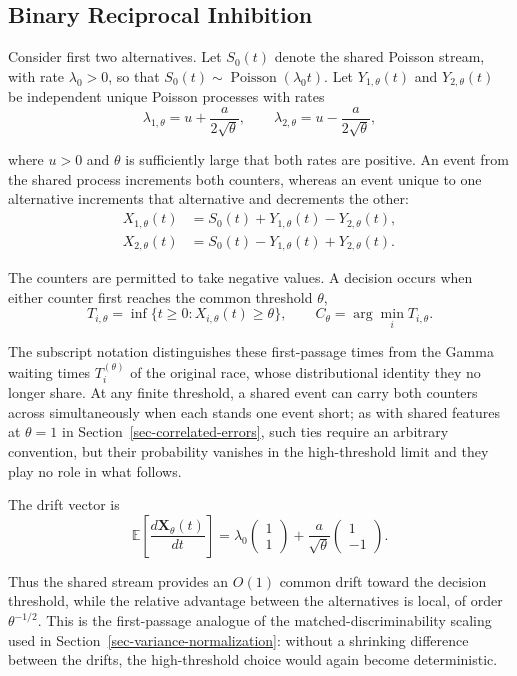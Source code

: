 \documentclass[
  man,
  floatsintext,
  longtable,
  a4paper,
  nolmodern,
  notxfonts,
  notimes,
  colorlinks=true,linkcolor=blue,citecolor=blue,urlcolor=blue]{apa7}
\begin{document}
\subsection{Binary Reciprocal
Inhibition}\label{binary-reciprocal-inhibition}

Consider first two alternatives. Let \(S_0(t)\) denote the shared
Poisson stream, with rate \(\lambda_0>0\), so that
\(S_0(t)\sim\operatorname{Poisson}(\lambda_0 t)\). Let
\(Y_{1,\theta}(t)\) and \(Y_{2,\theta}(t)\) be independent unique
Poisson processes with rates \[
\lambda_{1,\theta}
=
u+\frac{a}{2\sqrt{\theta}},
\qquad
\lambda_{2,\theta}
=
u-\frac{a}{2\sqrt{\theta}},
\]

where \(u>0\) and \(\theta\) is sufficiently large that both rates are
positive. An event from the shared process increments both counters,
whereas an event unique to one alternative increments that alternative
and decrements the other: \[
\begin{aligned}
X_{1,\theta}(t)
&=
S_0(t)+Y_{1,\theta}(t)-Y_{2,\theta}(t),\\
X_{2,\theta}(t)
&=
S_0(t)-Y_{1,\theta}(t)+Y_{2,\theta}(t).
\end{aligned}
\]

The counters are permitted to take negative values. A decision occurs
when either counter first reaches the common threshold \(\theta\), \[
T_{i,\theta}
=
\inf\{t\geq 0:X_{i,\theta}(t)\geq\theta\},
\qquad
C_\theta
=
\arg\min_i T_{i,\theta}.
\]

The subscript notation distinguishes these first-passage times from the
Gamma waiting times \(T_i^{(\theta)}\) of the original race, whose
distributional identity they no longer share. At any finite threshold, a
shared event can carry both counters across simultaneously when each
stands one event short; as with shared features at \(\theta=1\) in
Section~\ref{sec-correlated-errors}, such ties require an arbitrary
convention, but their probability vanishes in the high-threshold limit
and they play no role in what follows.

The drift vector is \[
\mathbb{E}
\left[
\frac{d\mathbf X_\theta(t)}{dt}
\right]
=
\lambda_0
\begin{pmatrix}
1\\
1
\end{pmatrix}
+
\frac{a}{\sqrt{\theta}}
\begin{pmatrix}
1\\
-1
\end{pmatrix}.
\]

Thus the shared stream provides an \(O(1)\) common drift toward the
decision threshold, while the relative advantage between the
alternatives is local, of order \(\theta^{-1/2}\). This is the
first-passage analogue of the matched-discriminability scaling used in
Section~\ref{sec-variance-normalization}: without a shrinking difference
between the drifts, the high-threshold choice would again become
deterministic.
\end{document}
